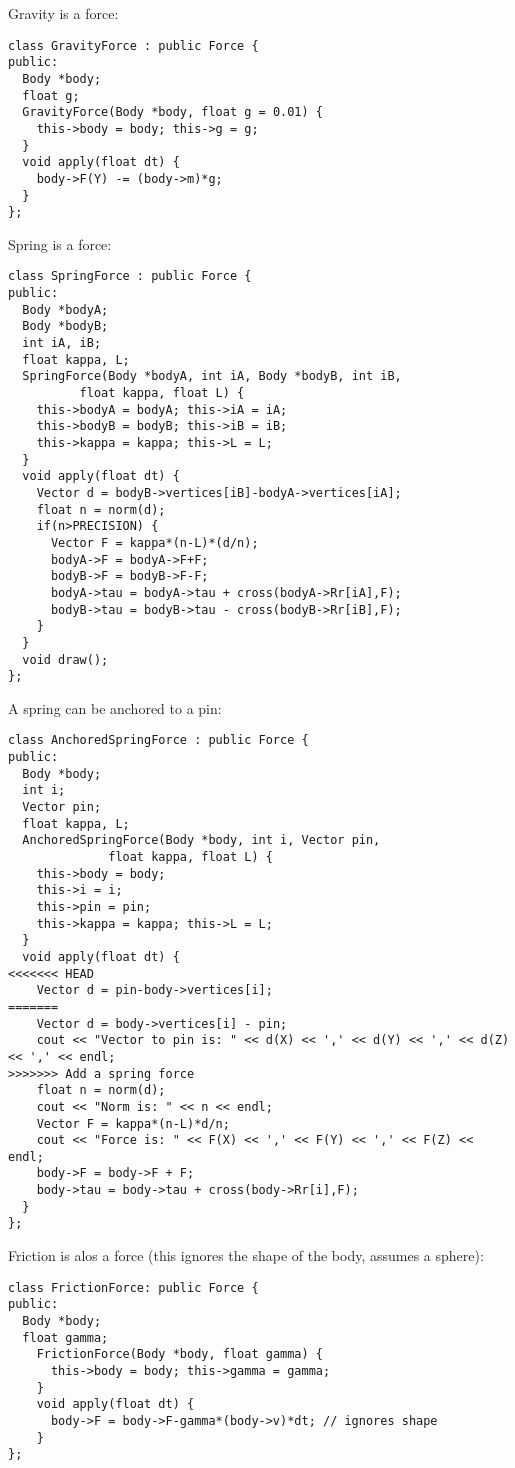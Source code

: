 \noindent
Gravity is a force: \begin{lstlisting}
class GravityForce : public Force {
public:  
  Body *body;
  float g;
  GravityForce(Body *body, float g = 0.01) {
    this->body = body; this->g = g;    
  }
  void apply(float dt) {
    body->F(Y) -= (body->m)*g;
  }
};
\end{lstlisting}
\noindent
Spring is a force: \begin{lstlisting}
class SpringForce : public Force {
public:
  Body *bodyA;
  Body *bodyB;
  int iA, iB;
  float kappa, L;
  SpringForce(Body *bodyA, int iA, Body *bodyB, int iB,
	      float kappa, float L) {
    this->bodyA = bodyA; this->iA = iA;
    this->bodyB = bodyB; this->iB = iB;
    this->kappa = kappa; this->L = L;
  }
  void apply(float dt) {
    Vector d = bodyB->vertices[iB]-bodyA->vertices[iA];
    float n = norm(d);
    if(n>PRECISION) {
      Vector F = kappa*(n-L)*(d/n);
      bodyA->F = bodyA->F+F;
      bodyB->F = bodyB->F-F;
      bodyA->tau = bodyA->tau + cross(bodyA->Rr[iA],F);
      bodyB->tau = bodyB->tau - cross(bodyB->Rr[iB],F);
    }
  }
  void draw();
};
\end{lstlisting}
\noindent
A spring can be anchored to a pin: \begin{lstlisting}
class AnchoredSpringForce : public Force {
public:
  Body *body;
  int i;
  Vector pin;
  float kappa, L;
  AnchoredSpringForce(Body *body, int i, Vector pin,
		      float kappa, float L) {
    this->body = body; 
    this->i = i;
    this->pin = pin;
    this->kappa = kappa; this->L = L;
  }
  void apply(float dt) {
<<<<<<< HEAD
    Vector d = pin-body->vertices[i];
=======
    Vector d = body->vertices[i] - pin;
    cout << "Vector to pin is: " << d(X) << ',' << d(Y) << ',' << d(Z) << ',' << endl;
>>>>>>> Add a spring force
    float n = norm(d);
    cout << "Norm is: " << n << endl;
    Vector F = kappa*(n-L)*d/n;
    cout << "Force is: " << F(X) << ',' << F(Y) << ',' << F(Z) << endl;
    body->F = body->F + F;
    body->tau = body->tau + cross(body->Rr[i],F);
  }
};
\end{lstlisting}
\noindent
Friction is alos a force
(this ignores the shape of the body, assumes a sphere): \begin{lstlisting}
class FrictionForce: public Force {
public:
  Body *body;
  float gamma;
    FrictionForce(Body *body, float gamma) {
      this->body = body; this->gamma = gamma;
    }
    void apply(float dt) {
      body->F = body->F-gamma*(body->v)*dt; // ignores shape
    }
};
\end{lstlisting}
